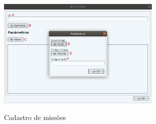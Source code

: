 \documentclass[
	12pt,				%
	oneside,			%
	a4paper,			%
	english,			%
	french,				%
	spanish,			%
	brazil,				%
	]{abntex2}
\begin{document}
\begin{figure}[H]
\centering
\caption{Cadastro de missões}
\includegraphics[width=0.7\textwidth]{imagens/visnode_cadastro_missao.png}
\sourceAuthor
\label{fig:visnodeCadastroMissoes}
\end{figure}
\end{document}
